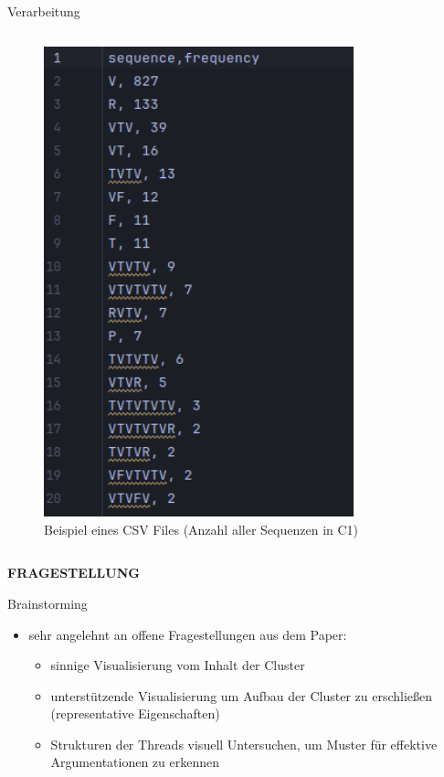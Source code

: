 \documentclass[compress,12pt]{beamer}
\begin{document}
\begin{frame}{Verarbeitung}
\begin{columns}
\begin{column}{0.5\textwidth}
\begin{figure}
                    \includegraphics[width=0.8\textwidth]{../images/csv-file-example}
                    \caption{Beispiel eines CSV Files (Anzahl aller Sequenzen in C1)}
                    \label{fig:csv-file-example}
                \end{figure}
            \end{column}
        \end{columns}
    \end{frame}

    \End


    \begin{frame}
        \centering
        \textbf{FRAGESTELLUNG}
    \end{frame}

    \begin{frame}{Brainstorming}
        \begin{itemize}
            \item sehr angelehnt an offene Fragestellungen aus dem Paper:
            \begin{itemize}
                \item sinnige Visualisierung vom Inhalt der Cluster
                \item unterstützende Visualisierung um Aufbau der Cluster zu erschließen (representative Eigenschaften)
                \item Strukturen der Threads visuell Untersuchen, um Muster für effektive Argumentationen zu erkennen
            \end{itemize}
        \end{itemize}
    \end{frame}
\end{document}
